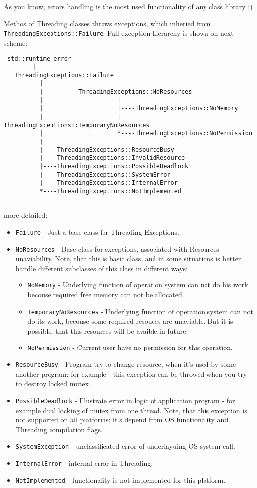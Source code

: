\documentclass[10pt]{article}
\begin{document}
 As you know, errors handling is the most used functionality of any
class library ;) 
 
 Methos of Threading classes throws exceptions, which inheried from
\verb|ThreadingExceptions::Failure|. Full exception hierarchy is
shown on next scheme:

\begin{verbatim}
 std::runtime_error
        |
   ThreadingExceptions::Failure
          |
          |----------ThreadingExceptions::NoResources
          |                     |
          |                     |----ThreadingExceptions::NoMemory
          |                     |----ThreadingExceptions::TemporaryNoResources
          |                     *----ThreadingExceptions::NoPermission 
          |
          |----ThreadingExceptions::ResourceBusy
          |----ThreadingExceptions::InvalidResource
          |----ThreadingExceptions::PossibleDeadlock
          |----ThreadingExceptions::SystemError
          |----ThreadingExceptions::InternalError
          *----ThreadingExceptions::NotImplemented
          
\end{verbatim}

 more detailed:
 \begin{itemize}
  \item \verb|Failure| - Just a base class for Threading Exceptions. 
  \item \verb|NoResources| - Base class for exceptions, associated with
 Resources unaviability. Note, that this is basic class, and in some situations
 is better handle different subclasses of this class in different ways:
  \begin{itemize}
  \item \verb|NoMemory| - Underlying function of operation system can not
 do his work becouse required free memory can not be allocated.
  \item \verb|TemporaryNoResources| - Underlying function of operation system 
can not do its work, becouse some required resouces are unaviable.
But it is possible, that this resources will be avaible in future.
  \item \verb|NoPermission| - Current user have no permission for this
operation.
  \end{itemize}
  \item \verb|ResourceBusy| - Program try to change resource, when it's used
by some another program: for example - this exception can be throwed when
you try to destroy locked mutex.
  \item \verb|PossibleDeadlock| - Illustrate error in logic of application
program - for example dual locking of mutex from one thread. Note, that this
exception is not supported on all platforms: it's depend from OS functionality and Threading compilation flags.
  \item \verb|SystemException| - unclassificated error of underlayuing OS system call.
  \item \verb|InternalError| - internal error in Threading.
  \item \verb|NotImplemented| - functionality is not implemented for this platform.
 \end{itemize}
\end{document}
